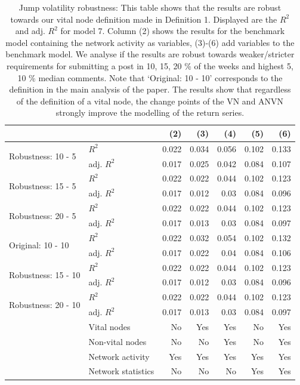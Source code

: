 \begin{table}[ht]
\centering
\caption{Jump volatility robustness: This table shows that the results are robust towards our vital node definition made in 
                    Definition 1. Displayed are the $R^2$ and adj. $R^2$ for model 7. Column (2) shows the results for the benchmark model containing the network activity as variables, (3)-(6) add variables to the benchmark model. 
                    We analyse if the results are robust towards weaker/stricter requirements for submitting a post 
                    in {10, 15, 20} \% of the weeks and highest {5, 10} \% median comments. Note that `Original: 10 - 10' corresponds to the 
                    definition in the main analysis of the paper. The results show that regardless of the definition of 
                    a vital node, the change points of the VN and ANVN strongly improve the modelling of the return series.} 
\label{table_r2_jv_robust}
\begingroup\scriptsize
\begin{tabular}{ll|rrrrr}
  \hline
\hline
  &    & (2) & (3) & (4) & (5) & (6) \\ 
  \hline
\multirow{2}{*}{Robustness: 10 - 5} & $R^2$  & 0.022 & 0.034 & 0.056 & 0.102 & 0.133 \\ 
    & adj. $R^2$ & 0.017 & 0.025 & 0.042 & 0.084 & 0.107 \\ 
   \hline
\multirow{2}{*}{Robustness: 15 - 5} & $R^2$  & 0.022 & 0.022 & 0.044 & 0.102 & 0.123 \\ 
    & adj. $R^2$  & 0.017 & 0.012 & 0.03 & 0.084 & 0.096 \\ 
   \hline
\multirow{2}{*}{Robustness: 20 - 5} & $R^2$  & 0.022 & 0.022 & 0.044 & 0.102 & 0.123 \\ 
    & adj. $R^2$  & 0.017 & 0.013 & 0.03 & 0.084 & 0.097 \\ 
   \hline
\multirow{2}{*}{Original: 10 - 10} & $R^2$  & 0.022 & 0.032 & 0.054 & 0.102 & 0.132 \\ 
    & adj. $R^2$  & 0.017 & 0.022 & 0.04 & 0.084 & 0.106 \\ 
   \hline
\multirow{2}{*}{Robustness: 15 - 10} & $R^2$  & 0.022 & 0.022 & 0.044 & 0.102 & 0.123 \\ 
    & adj. $R^2$  & 0.017 & 0.012 & 0.03 & 0.084 & 0.096 \\ 
   \hline
\multirow{2}{*}{Robustness: 20 - 10} & $R^2$  & 0.022 & 0.022 & 0.044 & 0.102 & 0.123 \\ 
    & adj. $R^2$  & 0.017 & 0.013 & 0.03 & 0.084 & 0.097 \\ 
   \hline & Vital nodes  & No & Yes & Yes & No & Yes \\ & Non-vital nodes  & No & No & Yes & No & Yes \\ & Network activity & Yes & Yes & Yes & Yes & Yes \\ & Network statistics  & No & No & No & Yes & Yes \\ \hline
\hline
\end{tabular}
\endgroup
\end{table}
